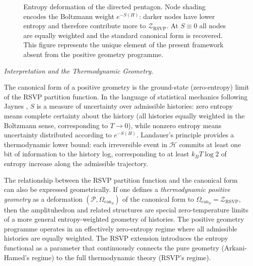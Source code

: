 \documentclass[11pt]{article}
\theoremstyle{plain}
\theoremstyle{definition}
\theoremstyle{remark}
\newcommand{\Sf}{S}
\newcommand{\HKS}{\mathcal{H}}
\newcommand{\CF}{\Omega_{\mathrm{can}}}
\newcommand{\ZRSVP}{\mathcal{Z}_{\mathrm{RSVP}}}
\begin{document}
\begin{figure}[H]
\centering
{}
\caption{Entropy deformation of the directed pentagon. Node shading
encodes the Boltzmann weight $e^{-\Sf(H)}$: darker nodes have lower
entropy and therefore contribute more to $\ZRSVP$. At $\Sf\equiv 0$
all nodes are equally weighted and the standard canonical form is
recovered. This figure represents the unique element of the present
framework absent from the positive geometry programme.}
\end{figure}

\medskip\noindent\textit{Interpretation and the Thermodynamic Geometry.}

The canonical form of a positive geometry is the ground-state (zero-entropy) limit of the RSVP partition function. In the language of statistical mechanics following Jaynes \cite{Jaynes1957}, $\Sf$ is a measure of uncertainty over admissible histories: zero entropy means complete certainty about the history (all histories equally weighted in the Boltzmann sense, corresponding to $T \to 0$), while nonzero entropy means uncertainty distributed according to $e^{-\Sf(H)}$. Landauer's principle \cite{Landauer1961} provides a thermodynamic lower bound: each irreversible event in $\HKS$ commits at least one bit of information to the history log, corresponding to at least $k_B T \log 2$ of entropy increase along the admissible trajectory.

The relationship between the RSVP partition function and the canonical form can also be expressed geometrically. If one defines a \emph{thermodynamic positive geometry} as a deformation $(\mathcal{P}, \CF_{\Sf})$ of the canonical form to $\CF_{\Sf} = \ZRSVP$, then the amplituhedron and related structures are special zero-temperature limits of a more general entropy-weighted geometry of histories. The positive geometry programme operates in an effectively zero-entropy regime where all admissible histories are equally weighted. The RSVP extension introduces the entropy functional as a parameter that continuously connects the pure geometry (Arkani-Hamed's regime) to the full thermodynamic theory (RSVP's regime).
\end{document}
